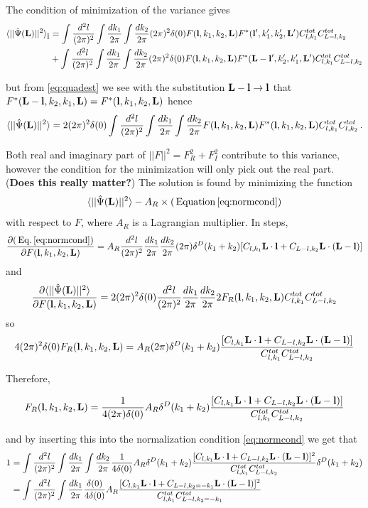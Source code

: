\documentclass[12pt]{article}
\newcommand{\beq}{\begin{equation}}
\newcommand{\eeq}{\end{equation}}
\newcommand{\beqal}{\begin{aligned}}
\newcommand{\eeqal}{\end{aligned}}
\def\l{{\bf l}}
\def\L{{\bf L}}
\def\tot{{\rm tot}}
\def\il{{\tilde{\rm I}}}
\def\d2l{\frac{d^2l}{(2\pi)^2}}
\def\dko{\frac{dk_1}{2\pi}}
\def\dkt{\frac{dk_2}{2\pi}}
\numberwithin{equation}{section}
\begin{document}
The condition of minimization of the variance gives 
\beq
\beqal
\langle ||\hat{\Psi}(\L)||^2\rangle_\il &= \int \d2l \int \dko \int \dkt (2\pi)^2 \delta(0) F(\l,k_1,k_2,\L)
F^*(\l',k_1',k_2',\L') C^{tot}_{l,k_1}C^{tot}_{L-l,k_2} \\
&  + \int \d2l \int \dko \int \dkt (2\pi)^2 \delta(0) F(\l,k_1,k_2,\L)
F^*(\L-\l',k_2',k_1',\L') C^{tot}_{l,k_1}C^{tot}_{L-l,k_2}
\eeqal
\eeq

but from \ref{eq:quadest} we see with the substitution $\L-\l
\rightarrow \l$ that $F^*(\L-\l,k_2,k_1,\L) = F^*(\l,k_1,k_2,\L)$
hence
\beq
\langle ||\hat{\Psi}(\L)||^2\rangle = 2 (2\pi)^2 \delta(0) \int \d2l \int \dko \int
\dkt F(\l,k_1,k_2,\L) F^*(\l,k_1,k_2,\L) C^{tot}_{l,k_1}C^{tot}_{l,k_2} \, .  \label{eq:phisqavg}
\eeq

Both real and imaginary part of $||F||^2=F_R^2+F_I^2$ contribute
to this variance, however the condition for the
minimization will only pick out the real part. (\textbf{Does this really matter?}) The solution is found
by minimizing the function
\beq
\langle ||\hat{\Psi}(\L)||^2\rangle- A_R \times (\, {\rm Equation} \, \ref{eq:normcond})
\eeq
with respect to $F$, where $A_R$ is a Lagrangian multiplier. In steps,
\beq
\frac{\partial (\, {\rm Eq.}\, \ref{eq:normcond})}{\partial F(\l,k_1,k_2,\L)} = A_R \d2l \dko \dkt
(2\pi) \delta^D(k_1+k_2) [C_{l,k_1} \L\cdot \l + C_{L-l,k_2} \L\cdot (\L-\l)]
\eeq
and
\beq
\frac{\partial \langle ||\hat{\Psi}(\L)||^2 \rangle}{\partial F(\l,k_1,k_2,\L)} =
2 (2\pi)^2 \delta(0) \d2l \dko \dkt 2 F_R(\l,k_1,k_2,\L)
C^{tot}_{l,k_1}C^{tot}_{L-l,k_2}
\eeq
so
\beq
\beqal
4 (2\pi)^2 \delta(0)  F_R(\l,k_1,k_2,\L) = A_R (2\pi) \delta^D(k_1+k_2) \frac{[C_{l,k_1} \L\cdot \l +
	C_{L-l,k_2} \L\cdot (\L-\l)]}{C^{tot}_{l,k_1}C^{tot}_{L-l,k_2}}
\label{eq:expforf}
\eeqal
\eeq

Therefore,

\beq
\beqal
F_R(\l,k_1,k_2,\L) = \frac{1}{4 (2\pi) \delta(0) } A_R \delta^D(k_1+k_2) \frac{[C_{l,k_1} \L\cdot \l +
	C_{L-l,k_2} \L\cdot (\L-\l)]}{C^{tot}_{l,k_1}C^{tot}_{L-l,k_2}}
\label{eq:expforf}
\eeqal
\eeq


and by inserting this into the normalization condition
\ref{eq:normcond} we get that
\beq
\beqal
1 &= \int \d2l \int \dko \int \dkt \frac{1}{4 \delta(0) } A_R \delta^D(k_1+k_2) \frac{[C_{l,k_1} \L\cdot \l +
	C_{L-l,k_2} \L\cdot (\L-\l)]^2}{C^{tot}_{l,k_1}C^{tot}_{L-l,k_2}} \delta^D(k_1+k_2) 
\\
& = \int \d2l \int \dko \frac{\delta(0)}{4 \delta(0) } A_R \frac{[C_{l,k_1} \L\cdot \l +
	C_{L-l,k_2 = -k_1} \L\cdot (\L-\l)]^2}{C^{tot}_{l,k_1}C^{tot}_{L-l,k_2 = -k_1}} 
\eeqal
\eeq
\end{document}
